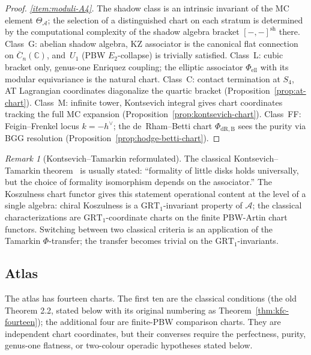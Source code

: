 \documentclass[11pt,reqno]{amsart}
\theoremstyle{definition}
\theoremstyle{remark}
\newtheorem{remark}[theorem]{Remark}
\newcommand{\cA}{\mathcal{A}}
\newcommand{\FM}{\overline{C}}
\newcommand{\bC}{\mathbb{C}}
\newcommand{\Etwo}{E_2}
\numberwithin{equation}{section}
\begin{document}
\begin{proof}
\emph{\ref{item:moduli-A4}.}
The shadow class is an intrinsic invariant of the MC element
$\Theta_\cA$; the selection of a distinguished chart on each
stratum is determined by the computational complexity of the
shadow algebra bracket $[-,-]^{\mathrm{sh}}$ there.
Class~G: abelian shadow algebra, KZ associator is the
canonical flat connection on $\FM_n(\bC)$, and~$U_1$ (PBW
$\Etwo$-collapse) is trivially satisfied.
Class~L: cubic bracket only, genus-one Enriquez coupling; the
elliptic associator $\Phi_{\mathrm{ell}}$ with its modular
equivariance is the natural chart.
Class~C: contact termination at $S_4$, AT Lagrangian coordinates
diagonalize the quartic bracket (Proposition~\ref{prop:at-chart}).
Class~M: infinite tower, Kontsevich integral gives chart
coordinates tracking the full MC expansion
(Proposition~\ref{prop:kontsevich-chart}).
Class~FF: Feigin--Frenkel locus $k = -h^\vee$; the de~Rham--Betti
chart $\Phi_{\mathrm{dR,B}}$ sees the purity via BGG resolution
(Proposition~\ref{prop:hodge-betti-chart}).
\end{proof}

\begin{remark}[Kontsevich--Tamarkin reformulated]
\label{rem:kt-reformulation}
The classical Kontsevich--Tamarkin theorem~\cite{Kontsevich99,Tamarkin03}
is usually stated: ``formality of little disks holds universally,
but the choice of formality isomorphism depends on the associator.''
The Koszulness chart functor gives this statement operational
content at the level of a single algebra: chiral Koszulness is a
$\mathrm{GRT}_1$-invariant property of $\cA$; the classical
characterizations are $\mathrm{GRT}_1$-coordinate charts on the
finite PBW-Artin chart functors.
Switching between two classical criteria is an application of the
Tamarkin $\Phi$-transfer; the transfer becomes trivial on the
$\mathrm{GRT}_1$-invariants.
\end{remark}

\subsection{Atlas}

The atlas has fourteen charts. The first ten are the classical
conditions (the old Theorem 2.2, stated below with its original
numbering as Theorem~\ref{thm:kfc-fourteen}); the additional four
are finite-PBW comparison charts. They are independent chart
coordinates, but their converses require the perfectness, purity,
genus-one flatness, or two-colour operadic hypotheses stated below.
\end{document}

